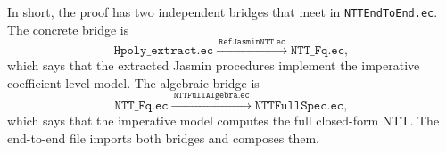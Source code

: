 In short, the proof has two independent bridges that meet in
\texttt{NTTEndToEnd.ec}.  The concrete bridge is
\[
  \texttt{Hpoly\_extract.ec}
  \xrightarrow{\ \texttt{RefJasminNTT.ec}\ }
  \texttt{NTT\_Fq.ec},
\]
which says that the extracted Jasmin procedures implement the imperative
coefficient-level model.  The algebraic bridge is
\[
  \texttt{NTT\_Fq.ec}
  \xrightarrow{\ \texttt{NTTFullAlgebra.ec}\ }
  \texttt{NTTFullSpec.ec},
\]
which says that the imperative model computes the full closed-form
\haetae{} NTT.  The end-to-end file imports both bridges and composes them.

